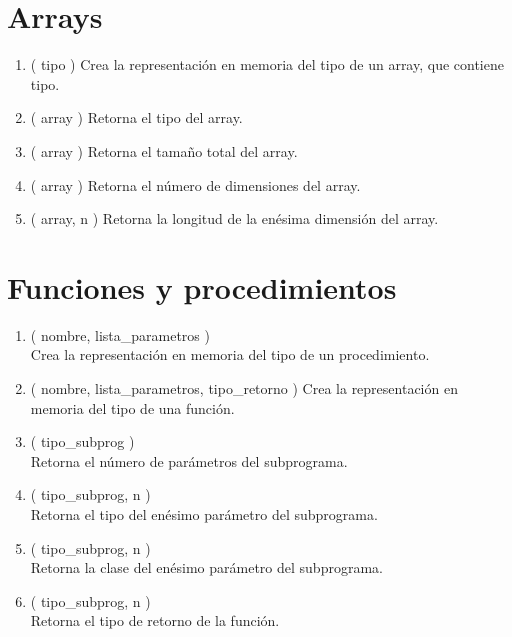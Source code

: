 \section{Arrays}

\begin{enumerate}

	\item {} ( tipo )
			Crea la representación en memoria del tipo de un array, que contiene tipo.
			
	\item {} ( array )
			Retorna el tipo del array.
			
	\item {} ( array )
			Retorna el tamaño total del array.
			
	\item {} ( array )
			Retorna el número de dimensiones del array.
	
	\item {} ( array, n )
			Retorna la longitud de la enésima dimensión del array.

\end{enumerate}

\section{Funciones y procedimientos}

\begin{enumerate}
		
	\item {} ( nombre, lista\_parametros ) \\
			Crea la representación en memoria del tipo de un procedimiento.
			
	\item {} ( nombre, lista\_parametros, tipo\_retorno )
			Crea la representación en memoria del tipo de una función.
			
	\item {} ( tipo\_subprog ) \\
			Retorna el número de parámetros del subprograma.

	\item {} ( tipo\_subprog, n ) \\
			Retorna el tipo del enésimo parámetro del subprograma.

	\item {} ( tipo\_subprog, n ) \\
			Retorna la clase del enésimo parámetro del subprograma.
	
	\item {} ( tipo\_subprog, n ) \\
			Retorna el tipo de retorno de la función.
			
\end{enumerate}

